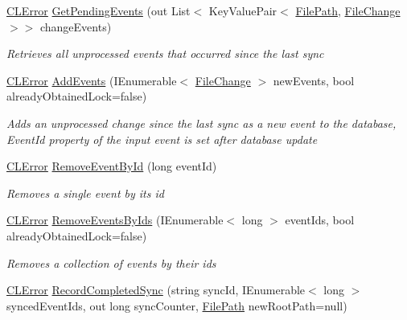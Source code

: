 \begin{DoxyCompactItemize}
\item 
\hyperlink{class_cloud_api_public_1_1_model_1_1_c_l_error}{C\-L\-Error} \hyperlink{class_cloud_api_public_1_1_s_q_l_indexer_1_1_indexing_agent_ab925fc9c21beaa2156e74544ca3e696d}{Get\-Pending\-Events} (out List$<$ Key\-Value\-Pair$<$ \hyperlink{class_cloud_api_public_1_1_model_1_1_file_path}{File\-Path}, \hyperlink{class_cloud_api_public_1_1_model_1_1_file_change}{File\-Change} $>$$>$ change\-Events)
\begin{DoxyCompactList}\small\item\em Retrieves all unprocessed events that occurred since the last sync \end{DoxyCompactList}\item 
\hyperlink{class_cloud_api_public_1_1_model_1_1_c_l_error}{C\-L\-Error} \hyperlink{class_cloud_api_public_1_1_s_q_l_indexer_1_1_indexing_agent_a33d5ccb1b74ad1e87ec44a7b56587c71}{Add\-Events} (I\-Enumerable$<$ \hyperlink{class_cloud_api_public_1_1_model_1_1_file_change}{File\-Change} $>$ new\-Events, bool already\-Obtained\-Lock=false)
\begin{DoxyCompactList}\small\item\em Adds an unprocessed change since the last sync as a new event to the database, Event\-Id property of the input event is set after database update \end{DoxyCompactList}\item 
\hyperlink{class_cloud_api_public_1_1_model_1_1_c_l_error}{C\-L\-Error} \hyperlink{class_cloud_api_public_1_1_s_q_l_indexer_1_1_indexing_agent_ab7f3d7d070951526e528e998ae26c664}{Remove\-Event\-By\-Id} (long event\-Id)
\begin{DoxyCompactList}\small\item\em Removes a single event by its id \end{DoxyCompactList}\item 
\hyperlink{class_cloud_api_public_1_1_model_1_1_c_l_error}{C\-L\-Error} \hyperlink{class_cloud_api_public_1_1_s_q_l_indexer_1_1_indexing_agent_a8c26e3fad07247b53f21bb280850abd1}{Remove\-Events\-By\-Ids} (I\-Enumerable$<$ long $>$ event\-Ids, bool already\-Obtained\-Lock=false)
\begin{DoxyCompactList}\small\item\em Removes a collection of events by their ids \end{DoxyCompactList}\item 
\hyperlink{class_cloud_api_public_1_1_model_1_1_c_l_error}{C\-L\-Error} \hyperlink{class_cloud_api_public_1_1_s_q_l_indexer_1_1_indexing_agent_a7aa84742829670c50f733190a8e841df}{Record\-Completed\-Sync} (string sync\-Id, I\-Enumerable$<$ long $>$ synced\-Event\-Ids, out long sync\-Counter, \hyperlink{class_cloud_api_public_1_1_model_1_1_file_path}{File\-Path} new\-Root\-Path=null)
$$
\end{DoxyCompactItemize}
